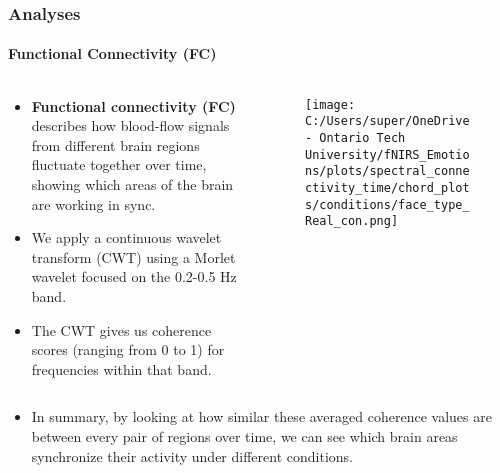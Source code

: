 \documentclass{beamer}
\begin{document}
\begin{frame}
    \frametitle{Analyses}
    \framesubtitle{Functional Connectivity (FC)}
    \begin{columns}
        \begin{column}{0.5\textwidth}
            \begin{itemize}
                \small
                \item \textbf{Functional connectivity (FC)} describes how blood-flow signals from different brain regions fluctuate together over time, showing which areas of the brain are working in sync.
                \item We apply a continuous wavelet transform (CWT) using a Morlet wavelet focused on the 0.2-0.5 Hz band.
                \item The CWT gives us coherence scores (ranging from 0 to 1) for frequencies within that band. 
            \end{itemize}
        \end{column}
        \begin{column}{0.5\textwidth}
            \begin{figure}
                \centering
                \texttt{[image: C:/Users/super/OneDrive - Ontario Tech University/fNIRS\_Emotions/plots/spectral\_connectivity\_time/chord\_plots/conditions/face\_type\_Real\_con.png]}
            \end{figure}
        \end{column}
    \end{columns}
    \begin{itemize}
        \small
        \item In summary, by looking at how similar these averaged coherence values are between every pair of regions over time, we can see which brain areas synchronize their activity under different conditions.
    \end{itemize}
\end{frame}
\end{document}
